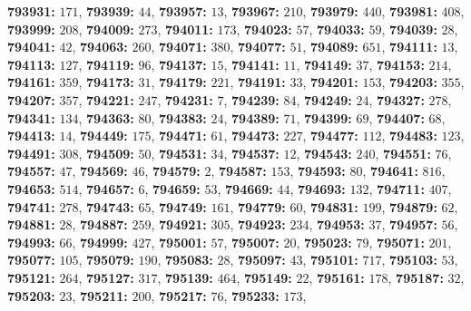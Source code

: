 \textsf{\bfseries 793931:} $171$, \textsf{\bfseries 793939:} $44$, \textsf{\bfseries 793957:} $13$, \textsf{\bfseries 793967:} $210$, \textsf{\bfseries 793979:} $440$, \textsf{\bfseries 793981:} $408$, \textsf{\bfseries 793999:} $208$, \textsf{\bfseries 794009:} $273$, \textsf{\bfseries 794011:} $173$, \textsf{\bfseries 794023:} $57$, \textsf{\bfseries 794033:} $59$, \textsf{\bfseries 794039:} $28$, \textsf{\bfseries 794041:} $42$, \textsf{\bfseries 794063:} $260$, \textsf{\bfseries 794071:} $380$, \textsf{\bfseries 794077:} $51$, \textsf{\bfseries 794089:} $651$, \textsf{\bfseries 794111:} $13$, \textsf{\bfseries 794113:} $127$, \textsf{\bfseries 794119:} $96$, \textsf{\bfseries 794137:} $15$, \textsf{\bfseries 794141:} $11$, \textsf{\bfseries 794149:} $37$, \textsf{\bfseries 794153:} $214$, \textsf{\bfseries 794161:} $359$, \textsf{\bfseries 794173:} $31$, \textsf{\bfseries 794179:} $221$, \textsf{\bfseries 794191:} $33$, \textsf{\bfseries 794201:} $153$, \textsf{\bfseries 794203:} $355$, \textsf{\bfseries 794207:} $357$, \textsf{\bfseries 794221:} $247$, \textsf{\bfseries 794231:} $7$, \textsf{\bfseries 794239:} $84$, \textsf{\bfseries 794249:} $24$, \textsf{\bfseries 794327:} $278$, \textsf{\bfseries 794341:} $134$, \textsf{\bfseries 794363:} $80$, \textsf{\bfseries 794383:} $24$, \textsf{\bfseries 794389:} $71$, \textsf{\bfseries 794399:} $69$, \textsf{\bfseries 794407:} $68$, \textsf{\bfseries 794413:} $14$, \textsf{\bfseries 794449:} $175$, \textsf{\bfseries 794471:} $61$, \textsf{\bfseries 794473:} $227$, \textsf{\bfseries 794477:} $112$, \textsf{\bfseries 794483:} $123$, \textsf{\bfseries 794491:} $308$, \textsf{\bfseries 794509:} $50$, \textsf{\bfseries 794531:} $34$, \textsf{\bfseries 794537:} $12$, \textsf{\bfseries 794543:} $240$, \textsf{\bfseries 794551:} $76$, \textsf{\bfseries 794557:} $47$, \textsf{\bfseries 794569:} $46$, \textsf{\bfseries 794579:} $2$, \textsf{\bfseries 794587:} $153$, \textsf{\bfseries 794593:} $80$, \textsf{\bfseries 794641:} $816$, \textsf{\bfseries 794653:} $514$, \textsf{\bfseries 794657:} $6$, \textsf{\bfseries 794659:} $53$, \textsf{\bfseries 794669:} $44$, \textsf{\bfseries 794693:} $132$, \textsf{\bfseries 794711:} $407$, \textsf{\bfseries 794741:} $278$, \textsf{\bfseries 794743:} $65$, \textsf{\bfseries 794749:} $161$, \textsf{\bfseries 794779:} $60$, \textsf{\bfseries 794831:} $199$, \textsf{\bfseries 794879:} $62$, \textsf{\bfseries 794881:} $28$, \textsf{\bfseries 794887:} $259$, \textsf{\bfseries 794921:} $305$, \textsf{\bfseries 794923:} $234$, \textsf{\bfseries 794953:} $37$, \textsf{\bfseries 794957:} $56$, \textsf{\bfseries 794993:} $66$, \textsf{\bfseries 794999:} $427$, \textsf{\bfseries 795001:} $57$, \textsf{\bfseries 795007:} $20$, \textsf{\bfseries 795023:} $79$, \textsf{\bfseries 795071:} $201$, \textsf{\bfseries 795077:} $105$, \textsf{\bfseries 795079:} $190$, \textsf{\bfseries 795083:} $28$, \textsf{\bfseries 795097:} $43$, \textsf{\bfseries 795101:} $717$, \textsf{\bfseries 795103:} $53$, \textsf{\bfseries 795121:} $264$, \textsf{\bfseries 795127:} $317$, \textsf{\bfseries 795139:} $464$, \textsf{\bfseries 795149:} $22$, \textsf{\bfseries 795161:} $178$, \textsf{\bfseries 795187:} $32$, \textsf{\bfseries 795203:} $23$, \textsf{\bfseries 795211:} $200$, \textsf{\bfseries 795217:} $76$, \textsf{\bfseries 795233:} $173$, 
